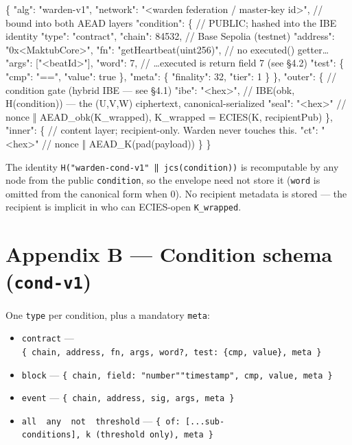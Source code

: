 \documentclass[
  11pt,
]{article}
\newenvironment{Shaded}{}{}
\newcommand{\NormalTok}[1]{#1}
\providecommand{\tightlist}{%
  \setlength{\itemsep}{0pt}\setlength{\parskip}{0pt}}
\begin{document}
\begin{Shaded}
\begin{Highlighting}[]
\NormalTok{\{}
\NormalTok{  "alg": "warden{-}v1",}
\NormalTok{  "network": "\textless{}warden federation / master{-}key id\textgreater{}",   // bound into both AEAD layers}
\NormalTok{  "condition": \{                                       // PUBLIC; hashed into the IBE identity}
\NormalTok{    "type": "contract",}
\NormalTok{    "chain": 84532,                                    // Base Sepolia (testnet)}
\NormalTok{    "address": "0x\textless{}MaktubCore\textgreater{}",}
\NormalTok{    "fn": "getHeartbeat(uint256)",                     // no executed() getter…}
\NormalTok{    "args": ["\textless{}beatId\textgreater{}"],}
\NormalTok{    "word": 7,                                         // …executed is return field 7 (see §4.2)}
\NormalTok{    "test": \{ "cmp": "==", "value": true \},}
\NormalTok{    "meta": \{ "finality": 32, "tier": 1 \}}
\NormalTok{  \},}
\NormalTok{  "outer": \{                  // condition gate (hybrid IBE — see §4.1)}
\NormalTok{    "ibe": "\textless{}hex\textgreater{}",           // IBE(obk, H(condition)) — the (U,V,W) ciphertext, canonical{-}serialized}
\NormalTok{    "seal": "\textless{}hex\textgreater{}"           // nonce ‖ AEAD\_obk(K\_wrapped), K\_wrapped = ECIES(K, recipientPub)}
\NormalTok{  \},}
\NormalTok{  "inner": \{                  // content layer; recipient{-}only. Warden never touches this.}
\NormalTok{    "ct": "\textless{}hex\textgreater{}"             // nonce ‖ AEAD\_K(pad(payload))}
\NormalTok{  \}}
\NormalTok{\}}
\end{Highlighting}
\end{Shaded}

The identity \texttt{H("warden-cond-v1"\ ‖\ jcs(condition))} is
recomputable by any node from the public \texttt{condition}, so the
envelope need not store it (\texttt{word} is omitted from the canonical
form when 0). No recipient metadata is stored --- the recipient is
implicit in who can ECIES-open \texttt{K\_wrapped}.

\section{\texorpdfstring{Appendix B --- Condition schema
(\texttt{cond-v1})}{Appendix B --- Condition schema (cond-v1)}}\label{appendix-b-condition-schema-cond-v1}

One \texttt{type} per condition, plus a mandatory \texttt{meta}:

\begin{itemize}
\tightlist
\item
  \texttt{contract} ---
  \texttt{\{\ chain,\ address,\ fn,\ args,\ word?,\ test:\ \{cmp,\ value\},\ meta\ \}}
\item
  \texttt{block} ---
  \texttt{\{\ chain,\ field:\ "number"\textbar{}"timestamp",\ cmp,\ value,\ meta\ \}}
\item
  \texttt{event} ---
  \texttt{\{\ chain,\ address,\ sig,\ args,\ meta\ \}}
\item
  \texttt{all\ \textbar{}\ any\ \textbar{}\ not\ \textbar{}\ threshold}
  ---
  \texttt{\{\ of:\ {[}...sub-conditions{]},\ k\ (threshold\ only),\ meta\ \}}
\end{itemize}
\end{document}
